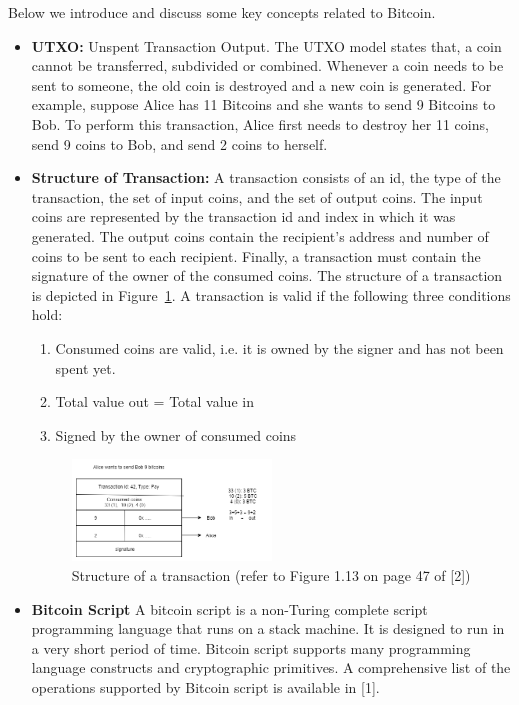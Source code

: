 \documentclass[twoside]{article}
\renewcommand{\cite}[1]{[#1]}
\begin{document}
	Below we introduce and discuss some key concepts related to Bitcoin.
	\begin{itemize}
		\item \textbf{UTXO:} Unspent Transaction Output.
		The UTXO model states that, a coin cannot be transferred, subdivided or combined. Whenever a coin needs to be sent to someone,
		the old coin is destroyed and a new coin is generated.
		For example, suppose Alice has 11 Bitcoins and she wants to send 9 Bitcoins to Bob. To perform this transaction, Alice first needs to destroy her 11 coins, send 9 coins to Bob, and send 2 coins to herself.
		\item \textbf{Structure of Transaction:} A transaction consists of an id, the type of the transaction, the set of input coins, and the set of output coins. The input coins are represented by the transaction id and index in which it was generated. The output coins contain the recipient's address and number of coins to be sent to each recipient. Finally, a transaction must contain the signature of the owner of the consumed coins. The structure of a transaction is depicted in Figure~\ref{fig:transaction}.
		A transaction is valid if the following three conditions hold:
		\begin{enumerate}
			\item Consumed coins are valid, i.e. it is owned by the signer and has not been spent yet.
			\item Total value out = Total value in
			\item Signed by the owner of consumed coins
		\end{enumerate}
		
		\begin{figure}[h]
			\label{fig:transaction}
			\centering
			\includegraphics[width=0.5\textwidth]{CS291D-lec2-graph3.png}
			\caption{Structure of a transaction
				(refer to Figure 1.13 on page 47 of \cite{2})}
		\end{figure}           
		
		
		
		\item \textbf{Bitcoin Script}
		A bitcoin script is a non-Turing complete script programming language that runs on a stack machine. It is designed to run in a very short period of time. Bitcoin script supports many programming language constructs and cryptographic primitives. A comprehensive list of the operations supported by Bitcoin script is available in \cite{1}.
		

\end{itemize}
\end{document}
